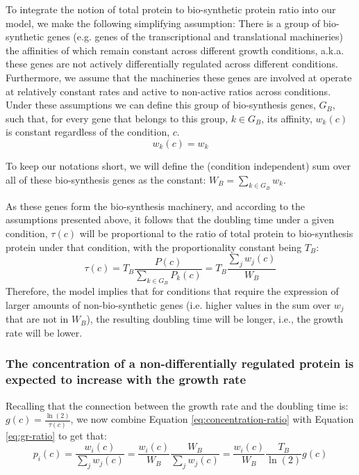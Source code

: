 \documentclass[notitlepage]{article}
\begin{document}
To integrate the notion of total protein to bio-synthetic protein ratio into our model, we make the following simplifying assumption:
There is a group of bio-synthetic genes (e.g. genes of the transcriptional and translational machineries) the affinities of which remain constant across different growth conditions, a.k.a. these genes are not actively differentially regulated across different conditions.
Furthermore, we assume that the machineries these genes are involved at operate at relatively constant rates and active to non-active ratios across conditions.
Under these assumptions we can define this group of bio-synthesis genes, $G_B$, such that, for every gene that belongs to this group, $k \in G_B$, its affinity, $w_k(c)$ is constant regardless of the condition, $c$.
\begin{equation}
  \label{eq:biosynth-def}
  w_k(c)=w_k
\end{equation}

To keep our notations short, we will define the (condition independent) sum over all of these bio-synthesis genes as the constant: $W_B = \sum_{k\in G_B}w_k$.

As these genes form the bio-synthesis machinery, and according to the assumptions presented above, it follows that the doubling time under a given condition, $\tau(c)$ will be proportional to the ratio of total protein to bio-synthesis protein under that condition, with the proportionality constant being $T_B$:
\begin{equation}
  \label{eq:gr-ratio}
  \tau(c) = T_B\frac{P(c)}{\sum_{k\in G_B}P_k(c)}=T_B\frac{\sum_jw_j(c)}{W_B}
\end{equation}
Therefore, the model implies that for conditions that require the expression of larger amounts of non-bio-synthetic genes (i.e. higher values in the sum over $w_j$ that are not in $W_B$), the resulting doubling time will be longer, i.e., the growth rate will be lower.

\subsubsection{The concentration of a non-differentially regulated protein is expected to increase with the growth rate} 
Recalling that the connection between the growth rate and the doubling time is: $g(c)=\frac{\ln(2)}{\tau(c)}$, we now combine Equation \ref{eq:concentration-ratio} with Equation \ref{eq:gr-ratio} to get that:
\begin{equation}
  \label{eq:default-response}
  p_i(c)=\frac{w_i(c)}{\sum_jw_j(c)}=\frac{w_i(c)}{W_B}\frac{W_B}{\sum_jw_j(c)}=\frac{w_i(c)}{W_B}\frac{T_B}{\ln(2)}g(c)
\end{equation}
\end{document}
